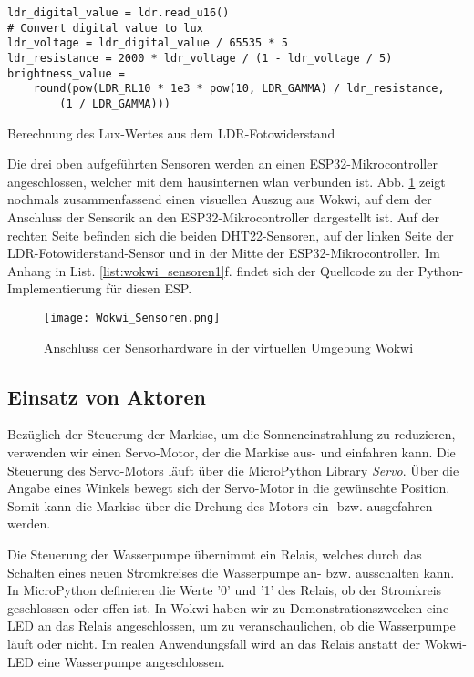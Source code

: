 \begin{listing}[!ht]
\begin{verbatim}
ldr_digital_value = ldr.read_u16()
# Convert digital value to lux
ldr_voltage = ldr_digital_value / 65535 * 5
ldr_resistance = 2000 * ldr_voltage / (1 - ldr_voltage / 5)
brightness_value = 
    round(pow(LDR_RL10 * 1e3 * pow(10, LDR_GAMMA) / ldr_resistance, 
        (1 / LDR_GAMMA)))
\end{verbatim}
\caption{Berechnung des Lux-Wertes aus dem LDR-Fotowiderstand}
\label{list:LDR_Berechnung}
\end{listing}

Die drei oben aufgeführten Sensoren werden an einen ESP32-Mikrocontroller angeschlossen, welcher mit dem hausinternen \gls{wlan} verbunden ist. Abb. \ref{fig:wokwi_sensoren} zeigt nochmals zusammenfassend einen visuellen Auszug aus Wokwi, auf dem der Anschluss der Sensorik an den ESP32-Mikrocontroller dargestellt ist. Auf der rechten Seite befinden sich die beiden DHT22-Sensoren, auf der linken Seite der LDR-Fotowiderstand-Sensor und in der Mitte der ESP32-Mikrocontroller. Im Anhang in List. \ref{list:wokwi_sensoren1}f. findet sich der Quellcode zu der Python-Implementierung für diesen ESP.

\begin{figure}[h]
    \centering
    \texttt{[image: Wokwi\_Sensoren.png]}
    \caption{Anschluss der Sensorhardware in der virtuellen Umgebung Wokwi}\label{fig:wokwi_sensoren}
\end{figure}

\subsection{Einsatz von Aktoren}
Bezüglich der Steuerung der Markise, um die Sonneneinstrahlung zu reduzieren, verwenden wir einen Servo-Motor, der die Markise aus- und einfahren kann. Die Steuerung des Servo-Motors läuft über die MicroPython Library \textit{Servo}. Über die Angabe eines Winkels bewegt sich der Servo-Motor in die gewünschte Position. Somit kann die Markise über die Drehung des Motors ein- bzw. ausgefahren werden.

Die Steuerung der Wasserpumpe übernimmt ein Relais, welches durch das Schalten eines neuen Stromkreises die Wasserpumpe an- bzw. ausschalten kann. In MicroPython definieren die Werte '0' und '1' des Relais, ob der Stromkreis geschlossen oder offen ist. In Wokwi haben wir zu Demonstrationszwecken eine LED an das Relais angeschlossen, um zu veranschaulichen, ob die Wasserpumpe läuft oder nicht. Im realen Anwendungsfall wird an das Relais anstatt der Wokwi-LED eine Wasserpumpe angeschlossen.

